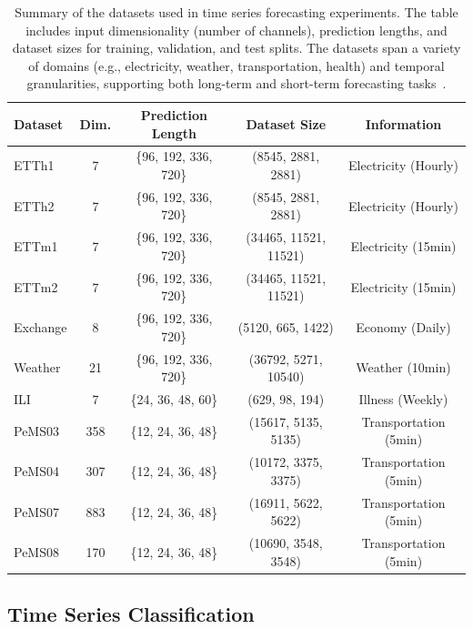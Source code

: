\begin{table}[h!]
\vspace{0.5cm}
\centering
\scriptsize
\renewcommand{\arraystretch}{1.2}
\setlength{\tabcolsep}{8pt}
\begin{tabular}{lcccc}
\toprule
\textbf{Dataset} & \textbf{Dim.} & \textbf{Prediction Length} & \textbf{Dataset Size} & \textbf{Information} \\
\midrule
ETTh1 & 7 & \{96, 192, 336, 720\} & (8545, 2881, 2881) & Electricity (Hourly) \\
ETTh2 & 7 & \{96, 192, 336, 720\} & (8545, 2881, 2881) & Electricity (Hourly) \\
ETTm1 & 7 & \{96, 192, 336, 720\} & (34465, 11521, 11521) & Electricity (15min) \\
ETTm2 & 7 & \{96, 192, 336, 720\} & (34465, 11521, 11521) & Electricity (15min) \\
Exchange & 8 & \{96, 192, 336, 720\} & (5120, 665, 1422) & Economy (Daily) \\
Weather & 21 & \{96, 192, 336, 720\} & (36792, 5271, 10540) & Weather (10min) \\
ILI & 7 & \{24, 36, 48, 60\} & (629, 98, 194) & Illness (Weekly) \\
PeMS03 & 358 & \{12, 24, 36, 48\} & (15617, 5135, 5135) & Transportation (5min) \\
PeMS04 & 307 & \{12, 24, 36, 48\} & (10172, 3375, 3375) & Transportation (5min) \\
PeMS07 & 883 & \{12, 24, 36, 48\} & (16911, 5622, 5622) & Transportation (5min) \\
PeMS08 & 170 & \{12, 24, 36, 48\} & (10690, 3548, 3548) & Transportation (5min) \\
\bottomrule
\end{tabular}
\caption{Summary of the datasets used in time series forecasting experiments. The table includes input dimensionality (number of channels), prediction lengths, and dataset sizes for training, validation, and test splits. The datasets span a variety of domains (e.g., electricity, weather, transportation, health) and temporal granularities, supporting both long-term and short-term forecasting tasks~\cite{liu2024itransformerinvertedtransformerseffective}.}
\label{tab:datasets}
\end{table}





\subsection*{Time Series Classification} \label{subsec:datasets-tsc}


